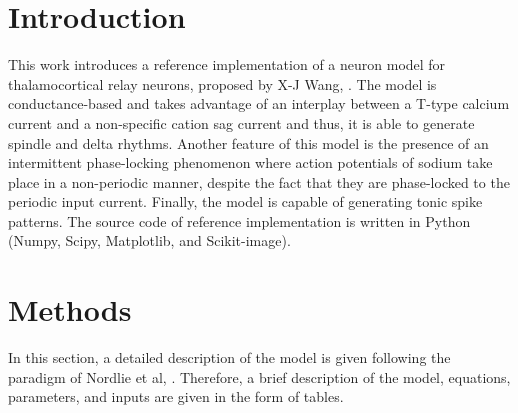 \documentclass[10pt,a4paper,onecolumn]{article}
\begin{document}
\section{Introduction}\label{introduction}

This work introduces a reference implementation of a neuron model for
thalamocortical relay neurons, proposed by X-J Wang, \cite{wang:1994}.
The model is conductance-based and takes advantage of an interplay between
a T-type calcium current and a non-specific cation sag current and thus, it
is able to generate spindle and delta rhythms. Another feature of this model
is the presence of an intermittent phase-locking phenomenon where action 
potentials of sodium take place in a non-periodic manner, despite the fact
that they are phase-locked to the periodic input current. Finally, the model
is capable of generating tonic spike patterns. The source code of
reference implementation is written in Python (Numpy, Scipy, Matplotlib,
and Scikit-image).


\section{Methods}\label{methods}

In this section, a detailed description of the model is given following 
the paradigm of Nordlie et al, \cite{nordlie:2009}. Therefore, a brief
description of the model, equations, parameters, and inputs are given in
the form of tables. 
\end{document}
